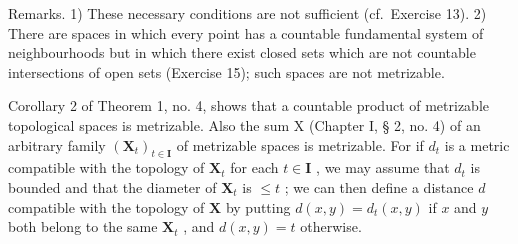 Remarks. 1) These necessary conditions are not sufficient (cf.~Exercise 13). 2) There are spaces in which every point has a countable fundamental system of neighbourhoods but in which there exist closed sets which are not countable intersections of open sets (Exercise 15); such spaces are not metrizable.

Corollary 2 of Theorem 1, no. 4, shows that a countable product of metrizable topological spaces is metrizable. Also the sum X (Chapter I, § 2, no. 4) of an arbitrary family \((\mathbf{X}_t)_{t \in \mathbf{I}}\) of metrizable spaces is metrizable. For if \(d_t\) is a metric compatible with the topology of \(\mathbf{X}_t\) for each \(t \in \mathbf{I}\) , we may assume that \(d_t\) is bounded and that the diameter of \(\mathbf{X}_t\) is \(\leqslant t\) ; we can then define a distance \(d\) compatible with the topology of \(\mathbf{X}\) by putting \(d(x, y) = d_t(x, y)\) if \(x\) and \(y\) both belong to the same \(\mathbf{X}_t\) , and \(d(x, y) = t\) otherwise.

